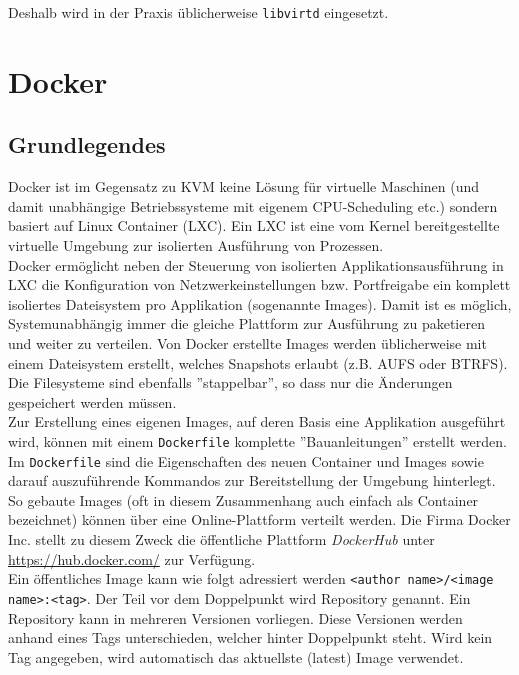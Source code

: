 Deshalb wird in der Praxis üblicherweise  \lstinline|libvirtd| eingesetzt.

\section{Docker}
\subsection{Grundlegendes}
Docker ist im Gegensatz zu KVM keine Lösung für virtuelle Maschinen (und damit unabhängige Betriebssysteme mit eigenem CPU-Scheduling etc.) sondern basiert auf Linux Container (LXC). Ein LXC ist eine vom Kernel bereitgestellte virtuelle Umgebung zur isolierten Ausführung von Prozessen. \\

Docker ermöglicht neben der Steuerung von isolierten Applikationsausführung in LXC die Konfiguration von Netzwerkeinstellungen bzw. Portfreigabe ein komplett isoliertes Dateisystem pro Applikation (sogenannte Images). Damit ist es möglich, Systemunabhängig immer die gleiche Plattform zur Ausführung zu paketieren und weiter zu verteilen. Von Docker erstellte Images werden üblicherweise mit einem Dateisystem erstellt, welches Snapshots erlaubt (z.B. AUFS oder BTRFS). Die Filesysteme sind ebenfalls ''stappelbar'', so dass nur die Änderungen gespeichert werden müssen. \\

Zur Erstellung eines eigenen Images, auf deren Basis eine Applikation ausgeführt wird, können mit einem \lstinline[]|Dockerfile| komplette ''Bauanleitungen'' erstellt werden. Im \lstinline[]|Dockerfile| sind die Eigenschaften des neuen Container und Images sowie darauf auszuführende Kommandos zur Bereitstellung der Umgebung hinterlegt. \\

So gebaute Images (oft in diesem Zusammenhang auch einfach als Container bezeichnet) können über eine Online-Plattform verteilt werden. Die Firma Docker Inc. stellt zu diesem Zweck die öffentliche Plattform \emph{DockerHub} unter \url{https://hub.docker.com/} zur Verfügung. \\

Ein öffentliches Image kann wie folgt adressiert werden \lstinline[]|<author name>/<image name>:<tag>|. Der Teil vor dem Doppelpunkt wird Repository genannt. Ein Repository kann in mehreren Versionen vorliegen. Diese Versionen werden anhand eines Tags unterschieden, welcher hinter Doppelpunkt steht. Wird kein Tag angegeben, wird automatisch das aktuellste (latest) Image verwendet. \\

